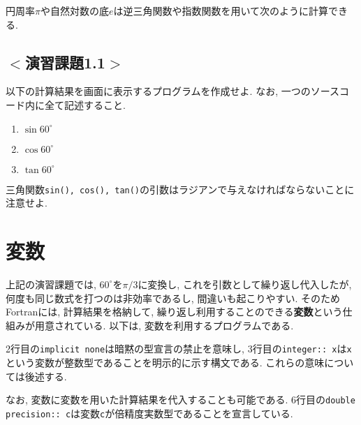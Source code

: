 円周率$\pi$や自然対数の底$e$は逆三角関数や指数関数を用いて次のように計算できる.



%


\subsection*{$<$演習課題1.1$>$}
以下の計算結果を画面に表示するプログラムを作成せよ. なお, 一つのソースコード内に全て記述すること.
\begin{enumerate}
\item $\sin 60^\circ$
\item $\cos 60^\circ$
\item $\tan 60^\circ$
\end{enumerate}
三角関数\verb|sin(), cos(), tan()|の引数はラジアンで与えなければならないことに注意せよ.

\section{変数}
上記の演習課題では, $60^\circ$を$\pi/3$に変換し, これを引数として繰り返し代入したが,
何度も同じ数式を打つのは非効率であるし, 間違いも起こりやすい.
そのためFortranには, 計算結果を格納して, 繰り返し利用することのできる{\bfseries 変数}という仕組みが用意されている.
以下は, 変数を利用するプログラムである.

2行目の\verb|implicit none|は暗黙の型宣言の禁止を意味し,
3行目の\verb|integer:: x|は\verb|x|という変数が整数型であることを明示的に示す構文である.
これらの意味については後述する.


なお, 変数に変数を用いた計算結果を代入することも可能である.
6行目の\verb|double precision:: c|は変数\verb|c|が倍精度実数型であることを宣言している.


